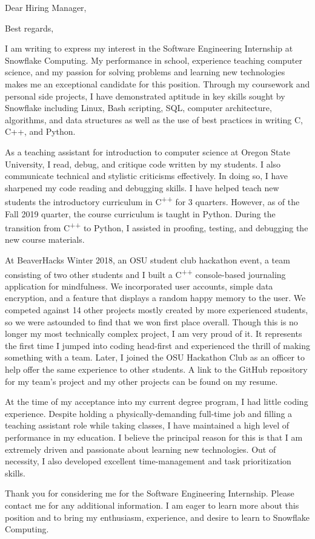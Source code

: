 \documentclass[11pt,a4paper,roman]{moderncv}        %
\begin{document}
\date{October 21, 2019}
\opening{Dear Hiring Manager,}
\closing{Best regards,}
\makelettertitle

I am writing to express my interest in the Software Engineering Internship at Snowflake Computing. My performance in school, experience teaching computer science, and my passion for solving problems and learning new technologies makes me an exceptional candidate for this position. Through my coursework and personal side projects, I have demonstrated aptitude in key skills sought by Snowflake including Linux, Bash scripting, SQL, computer architecture, algorithms, and data structures as well as the use of best practices in writing C, C++, and Python. 
 
As a teaching assistant for introduction to computer science at Oregon State University, I read, debug, and critique code written by my students. I also communicate technical and stylistic criticisms effectively. In doing so, I have sharpened my code reading and debugging skills. I have helped teach new students the introductory curriculum in C\textsuperscript{++} for 3 quarters. However, as of the Fall 2019 quarter, the course curriculum is taught in Python. During the transition from C\textsuperscript{++} to Python, I assisted in proofing, testing, and debugging the new course materials.
 
At BeaverHacks Winter 2018, an OSU student club hackathon event, a team consisting of two other students and I built a C\textsuperscript{++} console-based journaling application for mindfulness. We incorporated user accounts, simple data encryption, and a feature that displays a random happy memory to the user. We competed against 14 other projects mostly created by more experienced students, so we were astounded to find that we won first place overall. Though this is no longer my most technically complex project, I am very proud of it. It represents the first time I jumped into coding head-first and experienced the thrill of making something with a team. Later, I joined the OSU Hackathon Club as an officer to help offer the same experience to other students. A link to the GitHub repository for my team's project and my other projects can be found on my resume.
 
At the time of my acceptance into my current degree program, I had little coding experience. Despite holding a physically-demanding full-time job and filling a teaching assistant role while taking classes, I have maintained a high level of performance in my education. I believe the principal reason for this is that I am extremely driven and passionate about learning new technologies. Out of necessity, I also developed excellent time-management and task prioritization skills.

Thank you for considering me for the Software Engineering Internship. Please contact me for any additional information. I am eager to learn more about this position and to bring my enthusiasm, experience, and desire to learn to Snowflake Computing. 



\makeletterclosing
\end{document}
